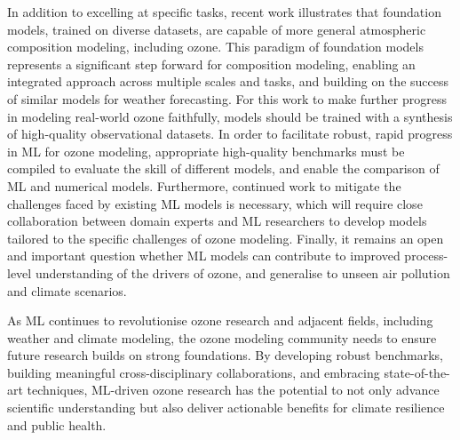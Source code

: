 \documentclass[gmd, manuscript]{copernicus}
\begin{document}
In addition to excelling at specific tasks, recent work illustrates that foundation models, trained on diverse datasets, are capable of more general atmospheric composition modeling, including ozone. This paradigm of foundation models represents a significant step forward for composition modeling, enabling an integrated approach across multiple scales and tasks, and building on the success of similar models for weather forecasting. For this work to make further progress in modeling real-world ozone faithfully, models should be trained with a synthesis of high-quality observational datasets. In order to facilitate robust, rapid progress in ML for ozone modeling, appropriate high-quality benchmarks must be compiled to evaluate the skill of different models, and enable the comparison of ML and numerical models. Furthermore, continued work to mitigate the challenges faced by existing ML models is necessary, which will require close collaboration between domain experts and ML researchers to develop models tailored to the specific challenges of ozone modeling. Finally, it remains an open and important question whether ML models can contribute to improved process-level understanding of the drivers of ozone, and generalise to unseen air pollution and climate scenarios.

As ML continues to revolutionise ozone research and adjacent fields, including weather and climate modeling, the ozone modeling community needs to ensure future research builds on strong foundations. By developing robust benchmarks, building meaningful cross-disciplinary collaborations, and embracing state-of-the-art techniques, ML-driven ozone research has the potential to not only advance scientific understanding but also deliver actionable benefits for climate resilience and public health.








\end{document}
